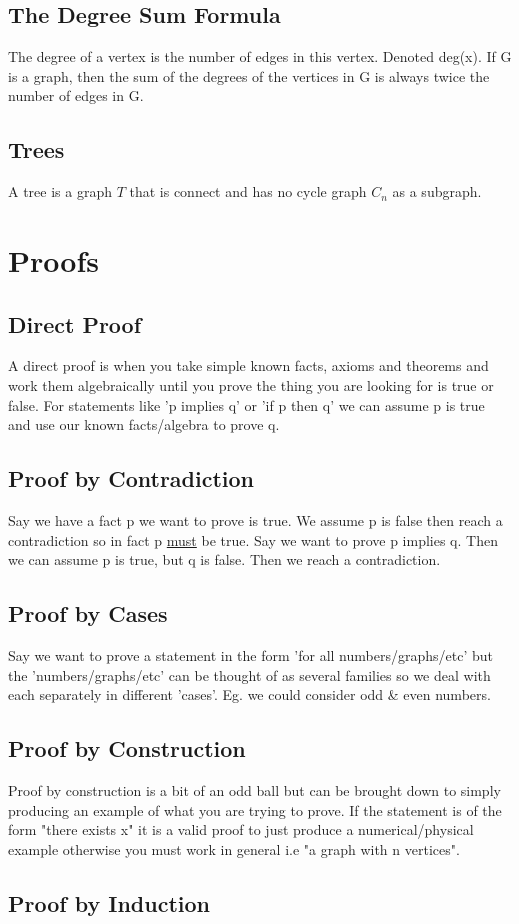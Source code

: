 \documentclass[12pt] {article}
\begin{document}
\subsection*{The Degree Sum Formula}
The degree of a vertex is the number of edges in this vertex. Denoted deg(x).
If G is a graph, then the sum of the degrees of the vertices in G is always twice the number of edges in G.

\subsection*{Trees}
A tree is a graph $T$ that is connect and has no cycle graph $C_n$ as a subgraph.

\section*{Proofs}
\subsection*{Direct Proof}
A direct proof is when you take simple known facts, axioms and theorems and 
work them algebraically until you prove the thing you are looking for is true or false.
For statements like 'p implies q' or 'if p then q' we can assume p is true and use 
our known facts/algebra to prove q.
\subsection*{Proof by Contradiction}
Say we have a fact p we want to prove is true. We assume p is false then reach
a contradiction so in fact p \underline{must} be true. Say we want to prove 
p implies q. Then we can assume p is true, but q is false. Then we reach a contradiction.
\subsection*{Proof by Cases}
Say we want to prove a statement in the form 'for all numbers/graphs/etc' but 
the 'numbers/graphs/etc' can be thought of as several families so we deal with each 
separately in different 'cases'. Eg. we could consider odd \& even numbers.
\subsection*{Proof by Construction}
Proof by construction is a bit of an odd ball but can be brought down to simply 
producing an example of what you are trying to prove. If the statement is 
of the form "there exists x" it is a valid proof to just produce a numerical/physical
example otherwise you must work in general i.e "a graph with n vertices".
\subsection*{Proof by Induction}
\end{document}
